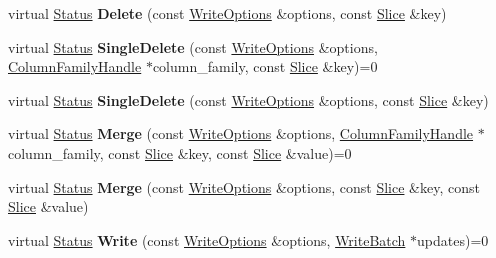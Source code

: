 \begin{DoxyCompactItemize}
\item 
virtual \hyperlink{classrocksdb_1_1Status}{Status} {\bfseries Delete} (const \hyperlink{structrocksdb_1_1WriteOptions}{Write\+Options} \&options, const \hyperlink{classrocksdb_1_1Slice}{Slice} \&key)\hypertarget{classrocksdb_1_1DB_a8fc5053ec040138744e90f0067ed6f5d}{}\label{classrocksdb_1_1DB_a8fc5053ec040138744e90f0067ed6f5d}

\item 
virtual \hyperlink{classrocksdb_1_1Status}{Status} {\bfseries Single\+Delete} (const \hyperlink{structrocksdb_1_1WriteOptions}{Write\+Options} \&options, \hyperlink{classrocksdb_1_1ColumnFamilyHandle}{Column\+Family\+Handle} $\ast$column\+\_\+family, const \hyperlink{classrocksdb_1_1Slice}{Slice} \&key)=0\hypertarget{classrocksdb_1_1DB_aacdb5c6a021a01e5ee0b9c45bef3a347}{}\label{classrocksdb_1_1DB_aacdb5c6a021a01e5ee0b9c45bef3a347}

\item 
virtual \hyperlink{classrocksdb_1_1Status}{Status} {\bfseries Single\+Delete} (const \hyperlink{structrocksdb_1_1WriteOptions}{Write\+Options} \&options, const \hyperlink{classrocksdb_1_1Slice}{Slice} \&key)\hypertarget{classrocksdb_1_1DB_a6354e7a166722545b44d751506d0239a}{}\label{classrocksdb_1_1DB_a6354e7a166722545b44d751506d0239a}

\item 
virtual \hyperlink{classrocksdb_1_1Status}{Status} {\bfseries Merge} (const \hyperlink{structrocksdb_1_1WriteOptions}{Write\+Options} \&options, \hyperlink{classrocksdb_1_1ColumnFamilyHandle}{Column\+Family\+Handle} $\ast$column\+\_\+family, const \hyperlink{classrocksdb_1_1Slice}{Slice} \&key, const \hyperlink{classrocksdb_1_1Slice}{Slice} \&value)=0\hypertarget{classrocksdb_1_1DB_ae9077bdc59ced0ea36abbe883036f4ba}{}\label{classrocksdb_1_1DB_ae9077bdc59ced0ea36abbe883036f4ba}

\item 
virtual \hyperlink{classrocksdb_1_1Status}{Status} {\bfseries Merge} (const \hyperlink{structrocksdb_1_1WriteOptions}{Write\+Options} \&options, const \hyperlink{classrocksdb_1_1Slice}{Slice} \&key, const \hyperlink{classrocksdb_1_1Slice}{Slice} \&value)\hypertarget{classrocksdb_1_1DB_a1efe3591397dba140128cf68d94c3a51}{}\label{classrocksdb_1_1DB_a1efe3591397dba140128cf68d94c3a51}

\item 
virtual \hyperlink{classrocksdb_1_1Status}{Status} {\bfseries Write} (const \hyperlink{structrocksdb_1_1WriteOptions}{Write\+Options} \&options, \hyperlink{classrocksdb_1_1WriteBatch}{Write\+Batch} $\ast$updates)=0\hypertarget{classrocksdb_1_1DB_ad5d37a09e90d0c22c9a0adca87267ebc}{}\label{classrocksdb_1_1DB_ad5d37a09e90d0c22c9a0adca87267ebc}


\end{DoxyCompactItemize}
